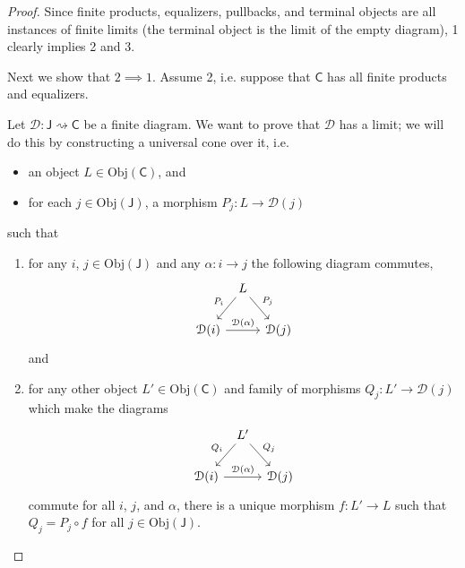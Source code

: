 \documentclass[a4paper]{report}
\newcommand{\Obj}{\mathrm{Obj}}
\theoremstyle{definition}
\theoremstyle{plain}
\theoremstyle{remark}
\begin{document}
\begin{proof}
  Since finite products, equalizers, pullbacks, and terminal objects are all instances of finite limits (the terminal object is the limit of the empty diagram), 1 clearly implies 2 and 3. 

  Next we show that $2 \implies 1$. Assume 2, i.e. suppose that $\mathsf{C}$ has all finite products and equalizers. 

  Let $\mathcal{D}\colon \mathsf{J} \rightsquigarrow \mathsf{C}$ be a finite diagram. We want to prove that $\mathcal{D}$ has a limit; we will do this by constructing a universal cone over it, i.e.
  \begin{itemize}
    \item an object $L \in \Obj(\mathsf{C})$, and
    \item for each $j \in \Obj(\mathsf{J})$, a morphism $P_{j}\colon L \to \mathcal{D}(j)$ 
  \end{itemize}
  such that
  \begin{enumerate}
    \item for any $i$, $j \in \Obj(\mathsf{J})$ and any $\alpha\colon i \to j$ the following diagram commutes,
      \begin{equation*}
        \begin{tikzcd}[column sep=tiny]
          & L
          \arrow[dl, swap, "P_{i}"]
          \arrow[dr, "P_{j}"]
          \\
          \mathcal{D}(i)
          \arrow[rr, "\mathcal{D}(\alpha)"]
          & & \mathcal{D}(j)
        \end{tikzcd}
      \end{equation*}
      and
    \item for any other object $L' \in \Obj(\mathsf{C})$ and family of morphisms $Q_{j}\colon L' \to \mathcal{D}(j)$ which make the diagrams
      \begin{equation*}
        \begin{tikzcd}[column sep=tiny]
          & L'
          \arrow[dl, swap, "Q_{i}"]
          \arrow[dr, "Q_{j}"]
          \\
          \mathcal{D}(i)
          \arrow[rr, "\mathcal{D}(\alpha)"]
          & & \mathcal{D}(j)
        \end{tikzcd}
      \end{equation*}
      commute for all $i$, $j$, and $\alpha$, there is a unique morphism $f\colon L' \to L$ such that $Q_{j} = P_{j} \circ f$ for all $j \in \Obj(\mathsf{J})$.
  \end{enumerate}


\end{proof}
\end{document}
